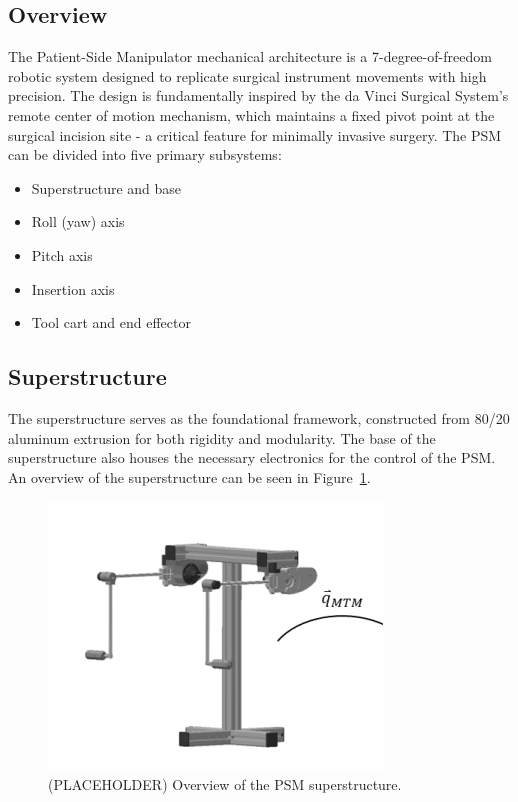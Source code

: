 \subsection{Overview}
The Patient-Side Manipulator mechanical architecture is a 7-degree-of-freedom robotic system designed to replicate surgical instrument movements with high precision. The design is fundamentally inspired by the da Vinci Surgical System's remote center of motion mechanism, which maintains a fixed pivot point at the surgical incision site - a critical feature for minimally invasive surgery. The PSM can be divided into five primary subsystems:

\begin{itemize}
    \item Superstructure and base
    \item Roll (yaw) axis
    \item Pitch axis
    \item Insertion axis
    \item Tool cart and end effector
\end{itemize}

\subsection{Superstructure}
The superstructure serves as the foundational framework, constructed from 80/20 aluminum extrusion for both rigidity and modularity. The base of the superstructure also houses the necessary electronics for the control of the PSM. An overview of the superstructure can be seen in Figure~\ref{fig:psm_superstructure_overview}. %

\begin{figure}[htb!] %
    \centering
    \includegraphics[width=1.0\linewidth]{figures/superstructure.png} 
    \caption{(PLACEHOLDER) Overview of the PSM superstructure.} 
    \label{fig:psm_superstructure_overview}
\end{figure}

